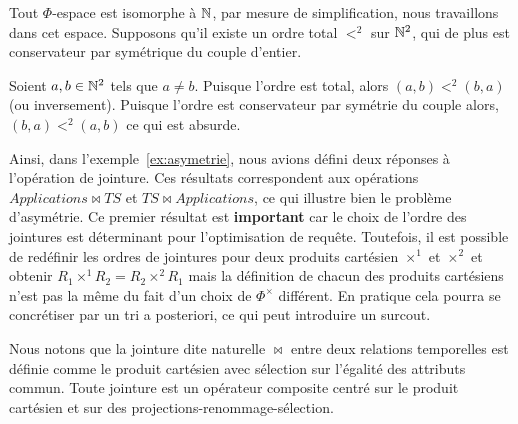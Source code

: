 \begin{demo}
    Tout $\Phi$-espace est isomorphe à $\mathbb{N}$, par mesure de simplification, nous travaillons dans cet espace. Supposons qu'il existe un ordre total $<^2$ sur $\mathbb{N}^2$, qui de plus est conservateur par symétrique du couple d'entier.

    Soient $a,b\in \mathbb{N}^2$ tels que $a \neq b$. Puisque l'ordre est total, alors $(a,b) <^2 (b,a)$ (ou inversement). Puisque l'ordre est conservateur par symétrie du couple alors, $(b,a) <^2 (a,b)$ ce qui est absurde.
\end{demo}

Ainsi, dans l'exemple~\ref{ex:asymetrie}, nous avions défini deux réponses à l'opération de jointure. Ces résultats correspondent aux opérations $Applications\Join TS$ et $TS \Join Applications$, ce qui illustre bien le problème d'asymétrie. Ce premier résultat est \textbf{important} car le choix de l'ordre des jointures est déterminant pour l'optimisation de requête. Toutefois, il est possible de redéfinir les ordres de jointures pour deux produits cartésien $\times^1$ et $\times^2$ et obtenir $R_1 \times^1 R_2 = R_2 \times^2 R_1$ mais la définition de chacun des produits cartésiens n'est pas la même du fait d'un choix de $\Phi^\times$ différent. En pratique cela pourra se concrétiser par un tri a posteriori, ce qui peut introduire un surcout.

Nous notons que la jointure dite naturelle $\Join$ entre deux relations temporelles est définie comme le produit cartésien avec sélection sur l'égalité des attributs commun. Toute jointure est un opérateur composite centré sur le produit cartésien et sur des projections-renommage-sélection.

